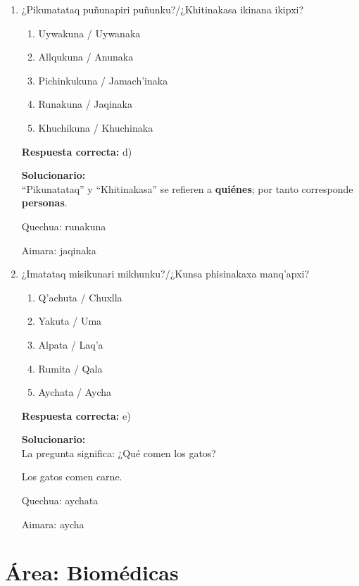 \begin{enumerate}
	
	\item ¿Pikunatataq puñunapiri puñunku?/¿Khitinakasa ikinana ikipxi?
	\begin{enumerate}[label=\alph*)]
		\item Uywakuna / Uywanaka
		\item Allqukuna / Anunaka
		\item Pichinkukuna / Jamach'inaka
		\item Runakuna / Jaqinaka
		\item Khuchikuna / Khuchinaka
	\end{enumerate}
	\textbf{Respuesta correcta:} d)
	
	\vspace{2mm}
	\textbf{Solucionario:}\\
	``Pikunatataq'' y ``Khitinakasa'' se refieren a \textbf{quiénes}; por tanto corresponde \textbf{personas}.
	
	Quechua: runakuna
	
	Aimara: jaqinaka
	
	\vspace{6mm}
	
	\item ¿Imatataq misikunari mikhunku?/¿Kunsa phisinakaxa manq'apxi?
	\begin{enumerate}[label=\alph*)]
		\item Q'achuta / Chuxlla
		\item Yakuta / Uma
		\item Alpata / Laq'a
		\item Rumita / Qala
		\item Aychata / Aycha
	\end{enumerate}
	\textbf{Respuesta correcta:} e)
	
	\vspace{2mm}
	\textbf{Solucionario:}\\
	La pregunta significa: ¿Qué comen los gatos?
	
	Los gatos comen carne.
	
	Quechua: aychata
	
	Aimara: aycha
	
	\vspace{6mm}
	
\end{enumerate}



\section*{Área: Biomédicas}

